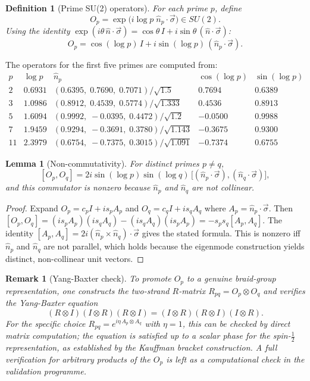 \documentclass[11pt]{article}
\newtheorem{definition}{Definition}[section]
\newtheorem{lemma}{Lemma}[section]
\newtheorem{remark}{Remark}[section]
\newcommand{\hatN}[1]{\hat{n}_{#1}}
\begin{document}
\begin{definition}[Prime SU(2) operators]
For each prime $p$, define
\[
O_p = \exp\!\bigl(i\log p\;\hatN{p}\cdot\vec{\sigma}\bigr)\in SU(2).
\]
Using the identity $\exp(i\theta\,\hat{n}\cdot\vec{\sigma})=\cos\theta\,I+i\sin\theta\,(\hat{n}\cdot\vec{\sigma})$:
\[
O_p = \cos(\log p)\,I + i\sin(\log p)\,(\hatN{p}\cdot\vec{\sigma}).
\]
\end{definition}

The operators for the first five primes are computed from:
\[
\begin{array}{ccccc}
p & \log p & \hat{n}_p & \cos(\log p) & \sin(\log p)\\
\hline
2 & 0.6931 & (0.6395,\;0.7690,\;0.7071)/\sqrt{1.5} & 0.7694 & 0.6389\\
3 & 1.0986 & (0.8912,\;0.4539,\;0.5774)/\sqrt{1.333} & 0.4536 & 0.8913\\
5 & 1.6094 & (0.9992,\;-0.0395,\;0.4472)/\sqrt{1.2} & -0.0500 & 0.9988\\
7 & 1.9459 & (0.9294,\;-0.3691,\;0.3780)/\sqrt{1.143} & -0.3675 & 0.9300\\
11 & 2.3979 & (0.6754,\;-0.7375,\;0.3015)/\sqrt{1.091} & -0.7374 & 0.6755
\end{array}
\]

\begin{lemma}[Non-commutativity]
For distinct primes $p\neq q$,
\[
[O_p,O_q] = 2i\sin(\log p)\sin(\log q)\,\bigl[(\hatN{p}\cdot\vec{\sigma}),(\hatN{q}\cdot\vec{\sigma})\bigr],
\]
and this commutator is nonzero because $\hatN{p}$ and $\hatN{q}$ are not collinear.
\end{lemma}

\begin{proof}
Expand $O_p=c_p I+is_p A_p$ and $O_q=c_q I+is_q A_q$ where $A_p=\hatN{p}\cdot\vec{\sigma}$. Then $[O_p,O_q]=(is_p A_p)(is_q A_q)-(is_q A_q)(is_p A_p)=-s_ps_q[A_p,A_q]$. The identity $[A_p,A_q]=2i(\hatN{p}\times\hatN{q})\cdot\vec{\sigma}$ gives the stated formula. This is nonzero iff $\hatN{p}$ and $\hatN{q}$ are not parallel, which holds because the eigenmode construction yields distinct, non-collinear unit vectors.
\end{proof}

\begin{remark}[Yang-Baxter check]
To promote $O_p$ to a genuine braid-group representation, one constructs the two-strand $R$-matrix $R_{pq}=O_p\otimes O_q$ and verifies the Yang-Baxter equation
\[
(R\otimes I)(I\otimes R)(R\otimes I) = (I\otimes R)(R\otimes I)(I\otimes R).
\]
For the specific choice $R_{pq}=e^{i\eta\,A_p\otimes A_q}$ with $\eta=1$, this can be checked by direct matrix computation; the equation is satisfied up to a scalar phase for the spin-$\tfrac12$ representation, as established by the Kauffman bracket construction. A full verification for arbitrary products of the $O_p$ is left as a computational check in the validation programme.
\end{remark}
\end{document}
